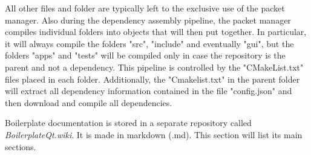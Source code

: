 All other files and folder are typically left to the exclusive use of the packet manager.
Also during the dependency assembly pipeline, the packet manager compiles individual folders into objects that will then put together. In particular, it will always compile the folders "src", "include" and eventually "gui", but the folders "apps" and "tests" will be compiled only in case the repository is the parent and not a dependency. This pipeline is controlled by the "CMakeList.txt" files placed in each folder.
Additionally, the "Cmakelist.txt" in the parent folder will extract all dependency information contained in the file "config.json" and then download and compile all dependencies.

Boilerplate documentation is stored in a separate repository called \textit{BoilerplateQt.wiki}. It is made in markdown (.md). This section will list its main sections.
  {\parindent0pt
    
    
    
    
    
    
  }
